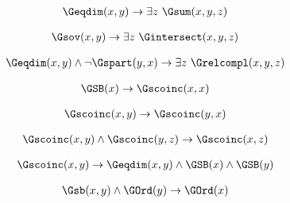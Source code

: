 \begin{erin}
    \begin{align*}
        \Geqdim(x,y) \to \exists z\ \Gsum(x,y,z)
    \end{align*}
\end{erin}

\begin{erin}
    \begin{align*}
        \Gsov(x,y) \to \exists z\ \Gintersect(x,y,z)
    \end{align*}
\end{erin}

\begin{erin}
    \begin{align*}
        \Geqdim(x,y) \wedge \neg\Gspart(y,x) \to \exists z\ \Grelcompl(x,y,z)
    \end{align*}
\end{erin}

\begin{erin}
    \begin{align*}
        \GSB(x) \to \Gscoinc(x,x)
    \end{align*}
\end{erin}

\begin{erin}
    \begin{align*}
        \Gscoinc(x,y) \to \Gscoinc(y,x)
    \end{align*}
\end{erin}

\begin{erin}
    \begin{align*}
        \Gscoinc(x,y) \wedge \Gscoinc(y,z) \to \Gscoinc(x,z)
    \end{align*}
\end{erin}

\begin{erin}
    \begin{align*}
        \Gscoinc(x,y) \to \Geqdim(x,y) \wedge \GSB(x) \wedge \GSB(y)
    \end{align*}
\end{erin}

\begin{erin}
    \begin{align*}
        \Gsb(x,y) \wedge \GOrd(y) \to \GOrd(x)
    \end{align*}
\end{erin}

